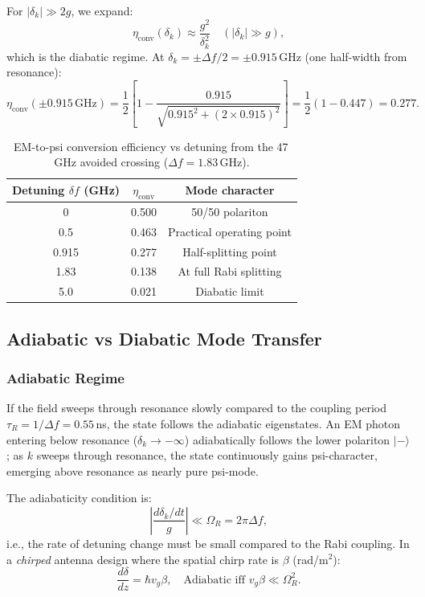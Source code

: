 \documentclass[aps,prd,twocolumn,superscriptaddress]{revtex4-2}
\begin{document}
For $|\delta_k| \gg 2g$, we expand:
\begin{equation}
\eta_\mathrm{conv}(\delta_k) \approx \frac{g^2}{\delta_k^2}
\quad(|\delta_k| \gg g),
\label{eq:eta_conv_offres}
\end{equation}
which is the diabatic regime.  At $\delta_k = \pm\Delta f/2 = \pm 0.915$\,GHz
(one half-width from resonance):
\begin{equation}
\eta_\mathrm{conv}(\pm0.915\,\mathrm{GHz})
= \frac{1}{2}\left[1 - \frac{0.915}{\sqrt{0.915^2+(2\times0.915)^2}}\right]
= \frac{1}{2}(1-0.447) = 0.277.
\label{eq:eta_conv_halfwidth}
\end{equation}

\begin{table}[H]
\centering
\caption{EM-to-psi conversion efficiency vs detuning from the
47\,GHz avoided crossing ($\Delta f = 1.83$\,GHz).}
\label{tab:polariton_efficiency}
\begin{tabular}{ccc}
\toprule
Detuning $\delta f$ (GHz) & $\eta_\mathrm{conv}$ & Mode character \\
\midrule
0     & 0.500 & 50/50 polariton \\
0.5   & 0.463 & Practical operating point \\
0.915 & 0.277 & Half-splitting point \\
1.83  & 0.138 & At full Rabi splitting \\
5.0   & 0.021 & Diabatic limit \\
\bottomrule
\end{tabular}
\end{table}

\subsection{Adiabatic vs Diabatic Mode Transfer}

\subsubsection{Adiabatic Regime}

If the field sweeps through resonance slowly compared to the
coupling period $\tau_R = 1/\Delta f = 0.55$\,ns, the state
follows the adiabatic eigenstates.  An EM photon entering below
resonance ($\delta_k \to -\infty$) adiabatically follows the
lower polariton $|-\rangle$; as $k$ sweeps through resonance,
the state continuously gains psi-character, emerging above
resonance as nearly pure psi-mode.

The adiabaticity condition is:
\begin{equation}
\left|\frac{d\delta_k/dt}{g}\right| \ll \Omega_R = 2\pi\Delta f,
\label{eq:adiabatic_condition}
\end{equation}
i.e., the rate of detuning change must be small compared to
the Rabi coupling.  In a \emph{chirped} antenna design where the
spatial chirp rate is $\beta$ (rad/m$^2$):
\begin{equation}
\frac{d\delta}{dz} = \hbar v_g \beta, \quad
\text{Adiabatic iff } v_g\beta \ll \Omega_R^2.
\label{eq:adiabatic_spatial}
\end{equation}
\end{document}
